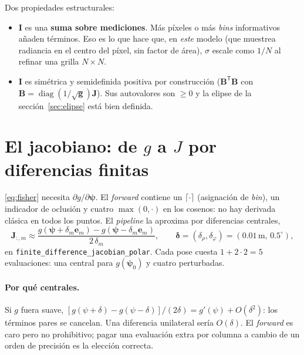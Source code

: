 \documentclass[11pt,a4paper]{article}
\newcommand{\vect}[1]{\boldsymbol{#1}}
\newcommand{\matr}[1]{\mathbf{#1}}
\newcommand{\code}[1]{\texttt{#1}}
\DeclareMathOperator{\diag}{diag}
\theoremstyle{definition}
\theoremstyle{plain}
\begin{document}
Dos propiedades estructurales:
%
\begin{itemize}[leftmargin=*]
  \item $\matr I$ es una \textbf{suma sobre mediciones}. M\'as p\'ixeles o
        m\'as \emph{bins} informativos a\~naden t\'erminos. Eso es lo que
        hace que, en \emph{este} modelo (que muestrea radiancia en el centro
        del p\'ixel, sin factor de \'area), $\sigma$ escale como $1/N$ al
        refinar una grilla $N\times N$.
  \item $\matr I$ es sim\'etrica y semidefinida positiva por construcci\'on
        ($\matr B^{\mathsf T}\matr B$ con
        $\matr B=\diag(1/\sqrt{\vect g})\matr J$). Sus autovalores son
        $\ge 0$ y la elipse de la secci\'on~\ref{sec:elipse} est\'a bien
        definida.
\end{itemize}

\section{El jacobiano: de $g$ a $J$ por diferencias finitas}
\label{sec:fd}

\eqref{eq:fisher} necesita $\partial g/\partial\vect\psi$. El \emph{forward}
contiene un $\lceil\cdot\rceil$ (asignaci\'on de \emph{bin}), un indicador de
oclusi\'on y cuatro $\max(0,\cdot)$ en los cosenos: no hay derivada cl\'asica
en todos los puntos. El \emph{pipeline} la aproxima por diferencias centrales,
%
\begin{equation}
\label{eq:fd}
\matr J_{:,m}
\approx
\frac{g(\vect\psi+\delta_m\vect e_m)-g(\vect\psi-\delta_m\vect e_m)}
     {2\,\delta_m},
\qquad
\vect\delta=(\delta_\rho,\delta_\varphi)=(0.01\,\mathrm{m},\,0.5^\circ),
\end{equation}
%
en \code{finite\_difference\_jacobian\_polar}. Cada pose cuesta $1+2\cdot 2=5$
evaluaciones: una central para $g(\vect\psi_0)$ y cuatro perturbadas.

\paragraph{Por qu\'e centrales.}
Si $g$ fuera suave,
$[g(\psi+\delta)-g(\psi-\delta)]/(2\delta)=g'(\psi)+O(\delta^2)$: los t\'erminos
pares se cancelan. Una diferencia unilateral ser\'ia $O(\delta)$. El
\emph{forward} es caro pero no prohibitivo; pagar una evaluaci\'on extra por
columna a cambio de un orden de precisi\'on es la elecci\'on correcta.
\end{document}
